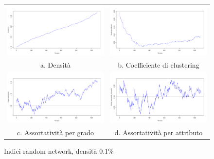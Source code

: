 \documentclass[a4paper,12pt]{article}
\begin{document}
\begin{figure}[t]
\begin{tabular}{cc}
  \includegraphics[width=83mm]{images/evolution_1000_rnd_1080_01_0.pdf} &   \includegraphics[width=83mm]{images/clustering_1000_rnd_1080_01_0.pdf} \\
a. Densità & b. Coefficiente di clustering \\[6pt]
 \includegraphics[width=83mm]{images/deg_assortativity_1000_rnd_1080_01_0.pdf} &   \includegraphics[width=83mm]{images/homophily_1000_rnd_1080_01_0.pdf} \\
c. Assortatività per grado & d. Assortatività per attributo \\[6pt]
\end{tabular}
\centering
\caption{Indici random network, densità 0.1\%}
\end{figure}
\end{document}
